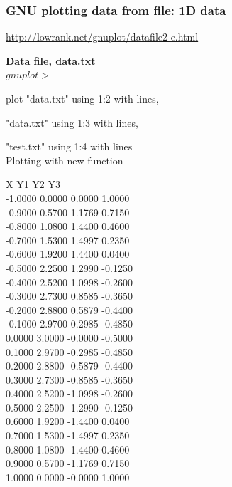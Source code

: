 \documentclass{beamer}
\begin{document}
		\begin{frame}\frametitle{GNU plotting data from file: 1D data}
			\url{http://lowrank.net/gnuplot/datafile2-e.html}
			\begin{minipage}{.48\textwidth}
				\footnotesize
				\textbf{Data file, data.txt}\\
				$gnuplot>$ 
	
				plot "data.txt" using 1:2 with lines,%
				
				"data.txt" using 1:3 with lines,%
			
				"test.txt" using 1:4 with lines \\[1em]
				
				Plotting with new function
				
			\end{minipage}
			\begin{minipage}{.48\textwidth}
				\tiny
				\center
				   X           Y1         Y2         Y3\\
				-1.0000    0.0000     0.0000     1.0000\\
				-0.9000    0.5700     1.1769     0.7150\\
				-0.8000    1.0800     1.4400     0.4600\\
				-0.7000    1.5300     1.4997     0.2350\\
				-0.6000    1.9200     1.4400     0.0400\\
				-0.5000    2.2500     1.2990    -0.1250\\
				-0.4000    2.5200     1.0998    -0.2600\\
				-0.3000    2.7300     0.8585    -0.3650\\
				-0.2000    2.8800     0.5879    -0.4400\\
				-0.1000    2.9700     0.2985    -0.4850\\
				0.0000    3.0000    -0.0000    -0.5000\\
				0.1000    2.9700    -0.2985    -0.4850\\
				0.2000    2.8800    -0.5879    -0.4400\\
				0.3000    2.7300    -0.8585    -0.3650\\
				0.4000    2.5200    -1.0998    -0.2600\\
				0.5000    2.2500    -1.2990    -0.1250\\
				0.6000    1.9200    -1.4400     0.0400\\
				0.7000    1.5300    -1.4997     0.2350\\
				0.8000    1.0800    -1.4400     0.4600\\
				0.9000    0.5700    -1.1769     0.7150\\
				1.0000    0.0000    -0.0000     1.0000
			\end{minipage}	
		\end{frame}	
\end{document}
